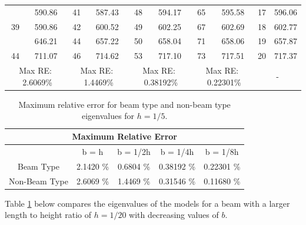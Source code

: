 \begin{table}[htbp]
{{\begin{tabular}{|cc|cc|cc|cc||cc|}
			\rowcolor{lightgray}{37} & 590.86 & {41} & 587.43 & {48} & 594.17 & {65} & 595.58 & 17    & 596.06 \\
			{39} & 590.86 & {42} & 600.52 & {49} & 602.25 & {67} & 602.69 & 18    & 602.77 \\
			\rowcolor{lightgray}{42} & 646.21 & {44} & 657.22 & {50} & 658.04 & {71} & 658.06 & 19    & 657.87 \\
			{44} & 711.07 & {46} & 714.62 & {53} & 717.10 & {73} & 717.51 & 20    & 717.37 \\
			\hline
			\hline
			\multicolumn{2}{|c|}{Max RE: \  2.6069\%} &\multicolumn{2}{c|}{Max RE: \ 1.4469\%}  & \multicolumn{2}{c|}{Max RE: \  0.38192\%}  & \multicolumn{2}{c||}{Max RE: \ 0.22301\%}& \multicolumn{2}{c|}{-} \\
			\hline
		\end{tabular}%
		\label{tab:2v3_1}%
	}}
\end{table}%
\FloatBarrier
\label{sym:RE}

\begin{table}[htbp]
	\centering
	\caption{Maximum relative error for beam type and non-beam type eigenvalues for $h = 1/5$.}
	\begin{tabular}{|c|cccc|}
		\hline
		\multicolumn{5}{|c|}{Maximum Relative Error} \\
		\hline
		\hline
		& {b = h} & {b = 1/2h} & {b = 1/4h} & {b = 1/8h} \\
		\hline
		Beam Type & 2.1420 \% & 0.6804 \% & 0.38192 \% & 0.22301 \% \\
		Non-Beam Type & 2.6069 \% & 1.4469 \% & 0.31546 \% & 0.11680 \% \\
		\hline
	\end{tabular}%
	\label{tab:2Dv3D_1_breakup}%
\end{table}%

Table \ref{tab:2v3_1} below compares the eigenvalues of the models for a beam with a larger length to height ratio of $h=1/20$ with decreasing values of $b$. 

